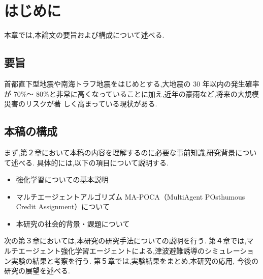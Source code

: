 \chapter{はじめに}
本章では,本論文の要旨および構成について述べる.
\section{要旨}
首都直下型地震や南海トラフ地震をはじめとする,大地震の 30 年以内の発生確率が 70\%～
80\%と非常に高くなっていることに加え,近年の豪雨など,将来の大規模災害のリスクが著
しく高まっている現状がある.
\section{本稿の構成}
まず,第２章において本稿の内容を理解するのに必要な事前知識,研究背景について述べる.
具体的には,以下の項目について説明する.
\begin{itemize}
  \item 強化学習についての基本説明
  \item マルチエージェントアルゴリズム MA-POCA（MultiAgent POsthumous Credit Assignment）について
  \item 本研究の社会的背景・課題について
\end{itemize}

次の第３章においては,本研究の研究手法についての説明を行う.
第４章では,マルチエージェント強化学習エージェントによる,津波避難誘導のシミュレーション実験の結果と考察を行う.
第５章では,実験結果をまとめ,本研究の応用, 今後の研究の展望を述べる.
